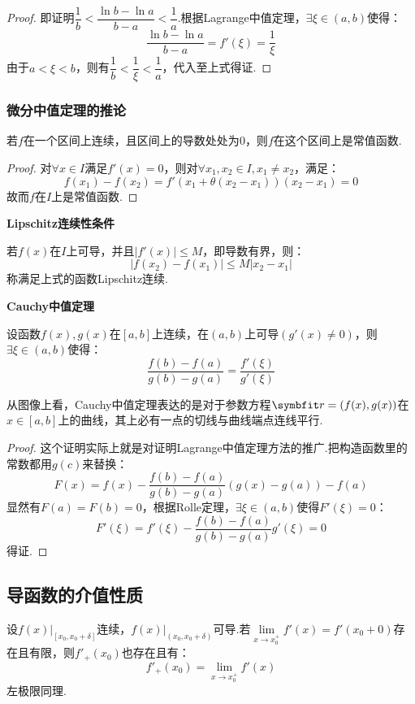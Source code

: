 \begin{proof}
    即证明$\dfrac{1}{b}<\dfrac{\ln b-\ln a}{b-a}<\dfrac{1}{a}$.根据Lagrange中值定理，$\exists \xi \in (a,b)$使得：
    \[\frac{\ln b -\ln a}{b-a} = f'(\xi) = \frac{1}{\xi}\]
    由于$a<\xi<b$，则有$\dfrac{1}{b}<\dfrac{1}{\xi}<\dfrac{1}{a}$，代入至上式得证.
\end{proof}


\subsubsection{微分中值定理的推论}
\begin{theorem}
    若$f$在一个区间上连续，且区间上的导数处处为$0$，则$f$在这个区间上是常值函数.
\end{theorem}

\begin{proof}
    对$\forall x \in I$满足$f'(x)=0$，则对$\forall x_1,x_2 \in I,x_1\neq x_2$，满足：
    \[f(x_1)-f(x_2) = f'(x_1+\theta(x_2-x_1))(x_2-x_1) = 0\]
    故而$f$在$I$上是常值函数.
\end{proof}

\begin{theorem}
    \textbf{Lipschitz连续性条件}

    若$f(x)$在$I$上可导，并且$|f'(x)|\leqslant M$，即导数有界，则：
    \[|f(x_2)-f(x_1)|\leqslant M|x_2-x_1|\]
    称满足上式的函数Lipschitz连续.
\end{theorem}

\begin{theorem}
    \textbf{Cauchy中值定理}

    设函数$f(x),g(x)$在$[a,b]$上连续，在$(a,b)$上可导$(g'(x)\neq 0)$，则$\exists \xi \in(a,b)$使得：
    \[\frac{f(b)-f(a)}{g(b)-g(a)} = \frac{f'(\xi)}{g'(\xi)}\]
\end{theorem}

从图像上看，Cauchy中值定理表达的是对于参数方程$\vb{r} = (f(x),g(x))$在$x \in [a,b]$上的曲线，其上必有一点的切线与曲线端点连线平行.

\begin{proof}
    这个证明实际上就是对证明Lagrange中值定理方法的推广.把构造函数里的常数都用$g(c)$来替换：
    \[F(x) = f(x) - \frac{f(b)-f(a)}{g(b)-g(a)}(g(x)-g(a)) - f(a)\]
    显然有$F(a)=F(b)=0$，根据Rolle定理，$\exists \xi \in (a,b)$使得$F'(\xi)=0$：
    \[F'(\xi) = f'(\xi) - \frac{f(b)-f(a)}{g(b)-g(a)}g'(\xi) = 0\]
    得证.
\end{proof}


\subsection{导函数的介值性质}
\begin{theorem}
    设$\left.f(x)\right|_{[x_0,x_0+\delta]}$连续，$\left.f(x)\right|_{(x_0,x_0+\delta)}$可导.若$\lim\limits_{x \to x_0^+} f'(x) = f'(x_0+0)$存在且有限，则$f'_+(x_0)$也存在且有：
    \[f'_+(x_0) = \lim\limits_{x \to x_0^+} f'(x)\]
    左极限同理.
\end{theorem}

